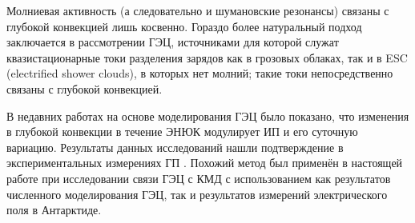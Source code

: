 Молниевая активность (а следовательно и шумановские резонансы) связаны с глубокой конвекцией лишь косвенно. Гораздо более натуральный подход заключается в рассмотрении ГЭЦ, источниками для которой служат квазистационарные токи разделения зарядов как в грозовых облаках, так и в ESC (electrified shower clouds), в которых нет молний; такие токи непосредственно связаны с глубокой конвекцией.

В недавних работах \cite{Slyunyaev_et_al_2021a,Slyunyaev_et_al_2021b} на основе моделирования ГЭЦ было показано, что изменения в глубокой конвекции в течение ЭНЮК модулирует ИП и его суточную вариацию. Результаты данных исследований нашли подтверждение в экспериментальных измерениях ГП \cite{Harrison_et_al_2011,Slyunyaev_et_al_2021c}. Похожий метод был применён в настоящей работе при исследовании связи ГЭЦ с КМД с использованием как результатов численного моделирования ГЭЦ, так и результатов измерений электрического поля в Антарктиде.
